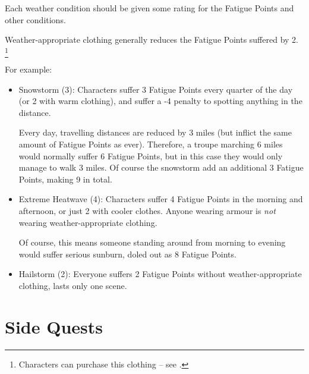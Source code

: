 \begin{multicols}{2}
Each weather condition should be given some rating for the Fatigue Points and other conditions.

Weather-appropriate clothing generally reduces the Fatigue Points suffered by 2.%
\footnote{Characters can purchase this clothing -- see .}

For example:

\begin{itemize}

  \item
  Snowstorm (3):
  Characters suffer 3 Fatigue Points every quarter of the day (or 2 with warm clothing), and suffer a -4 penalty to spotting anything in the distance.

  Every day, travelling distances are reduced by 3 miles (but inflict the same amount of Fatigue Points as ever).
  Therefore, a troupe marching 6 miles would normally suffer 6 Fatigue Points, but in this case they would only manage to walk 3 miles.
  Of course the snowstorm add an additional 3 Fatigue Points, making 9 in total.
  \item
  Extreme Heatwave (4):
  Characters suffer 4 Fatigue Points in the morning and afternoon, or just 2 with cooler clothes.
  Anyone wearing armour is \emph{not} wearing weather-appropriate clothing.

  Of course, this means someone standing around from morning to evening would suffer serious sunburn, doled out as 8 Fatigue Points.
  \item
  Hailstorm (2):
  Everyone suffers 2 Fatigue Points without weather-appropriate clothing, lasts only one scene.

\end{itemize}

\end{multicols}

\section{Side Quests}\label{sidequests}

